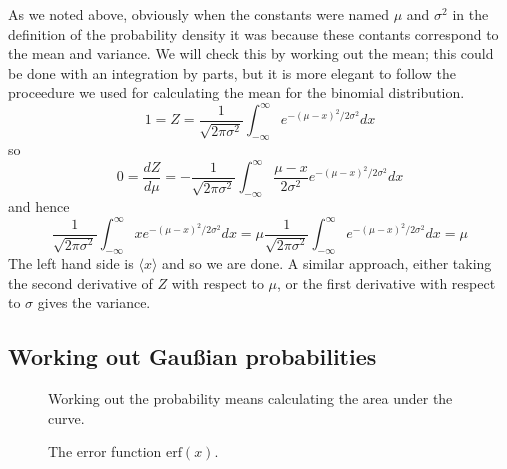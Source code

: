 \documentclass[11pt,a4paper]{scrartcl}
\begin{document}
As we noted above, obviously when the constants were named $\mu$ and
$\sigma^2$ in the definition of the probability density it was because
these contants correspond to the mean and variance. We will check this
by working out the mean; this could be done with an integration by
parts, but it is more elegant to follow the proceedure we used for
calculating the mean for the binomial distribution.
\begin{equation}
1=Z=\frac{1}{\sqrt{2\pi \sigma^2}}\int_{-\infty}^\infty e^{-(\mu-x)^2/2\sigma^2}dx
\end{equation}
so
\begin{equation}
0=\frac{dZ}{d\mu}=-\frac{1}{\sqrt{2\pi \sigma^2}}\int_{-\infty}^\infty\frac{\mu-x}{2\sigma^2} e^{-(\mu-x)^2/2\sigma^2}dx
\end{equation}
and hence
\begin{equation}
\frac{1}{\sqrt{2\pi \sigma^2}}\int_{-\infty}^\infty xe^{-(\mu-x)^2/2\sigma^2}dx=\mu\frac{1}{\sqrt{2\pi \sigma^2}}\int_{-\infty}^\infty e^{-(\mu-x)^2/2\sigma^2}dx=\mu
\end{equation}
The left hand side is $\langle x\rangle$ and so we are done. A similar
approach, either taking the second derivative of $Z$ with respect to
$\mu$, or the first derivative with respect to $\sigma$ gives the
variance.


\subsection*{Working out Gau\ss{}ian probabilities}


\begin{figure}[tb]
\begin{center}

\end{center}
\caption{Working out the probability means calculating the area under the curve.\label{fig_prob}}
\end{figure}


\begin{figure}[tb]
\begin{center}

\end{center}
\caption{The error function $\mbox{erf}(x)$.\label{fig_erf}}
\end{figure}
\end{document}
